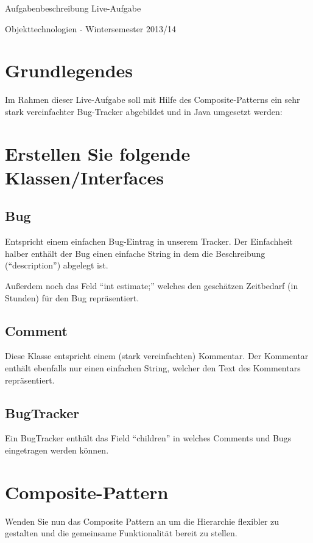 \documentclass[oneside,a4paper]{scrartcl}
\author{Johannes Schneider}
\begin{document}
\centerline{\sc \large Aufgabenbeschreibung Live-Aufgabe}
\vspace{.5pc}
\centerline{\sc Objekttechnologien - Wintersemester 2013/14}
\vspace{2pc}



\section{Grundlegendes}

Im Rahmen dieser Live-Aufgabe soll mit Hilfe des Composite-Patterns ein 
sehr stark vereinfachter Bug-Tracker abgebildet und in Java umgesetzt werden:


\section{Erstellen Sie folgende Klassen/Interfaces}


\subsection{Bug}
Entspricht einem einfachen Bug-Eintrag in unserem Tracker. Der Einfachheit halber enthält
der Bug einen einfache String in dem die Beschreibung (\enquote{description}) abgelegt ist.

Außerdem noch das Feld \enquote{int estimate;} welches den
geschätzen Zeitbedarf (in Stunden) für den Bug repräsentiert.



\subsection{Comment}
Diese Klasse entspricht einem (stark vereinfachten) Kommentar. Der Kommentar enthält ebenfalls
nur einen einfachen String, welcher den Text des Kommentars repräsentiert.


\subsection{BugTracker}
Ein BugTracker enthält das Field \enquote{children} in welches Comments und Bugs eingetragen werden können.


\section{Composite-Pattern}
Wenden Sie nun das Composite Pattern an um die Hierarchie flexibler zu gestalten und die gemeinsame Funktionalität bereit zu stellen.
\end{document}
